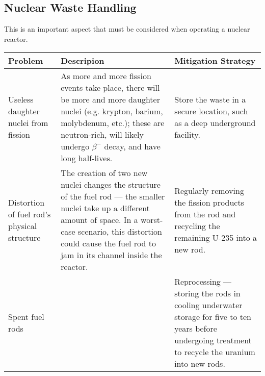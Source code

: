 \documentclass[a4paper,12pt]{article}
\begin{document}
\pagebreak

\subsection{Nuclear Waste Handling}

This is an important aspect that must be considered when operating a nuclear reactor.

\begin{longtable}{|p{}|p{}|p{}|}\hline
  \rowcolor{TealBlue!100!black!20} Problem                                                                     & Descripion                                                                                                                                                                                                               & Mitigation Strategy                                                                                                                                     \\ \hline
  Useless daughter nuclei from fission                                                                         & As more and more fission events take place, there will be more and more daughter nuclei (e.g. krypton, barium, molybdenum, etc.); these are neutron-rich, will likely undergo $\beta^-$ decay, and have long half-lives. & Store the waste in a secure location, such as a deep underground facility.                                                                              \\ \hline
  Distortion of fuel rod's physical structure                                                                  & The creation of two new nuclei changes the structure of the fuel rod --- the smaller nuclei take up a different amount of space.
  In a worst-case scenario, this distortion could cause the fuel rod to jam in its channel inside the reactor. & Regularly removing the fission products from the rod and recycling the remaining U-235 into a new rod.                                                                                                                                                                                                                                                                             \\ \hline
  Spent fuel rods                                                                                              &                                                                                                                                                                                                                          & Reprocessing --- storing the rods in cooling underwater storage for five to ten years before undergoing treatment to recycle the uranium into new rods. \\ \hline

\end{longtable}
\end{document}
